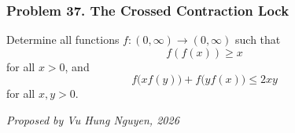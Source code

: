 \subsubsection*{Problem 37. The Crossed Contraction Lock}

\begin{exercisebox}[medium]

Determine all functions $f:(0,\infty)\to(0,\infty)$ such that
\[
f(f(x))\ge x
\]
for all $x>0$, and
\[
\boxed{f\bigl(xf(y)\bigr)+f\bigl(yf(x)\bigr)\le 2xy}
\]
for all $x,y>0$.

\begin{flushright}
\textit{Proposed by Vu Hung Nguyen, 2026}
\end{flushright}


\end{exercisebox}